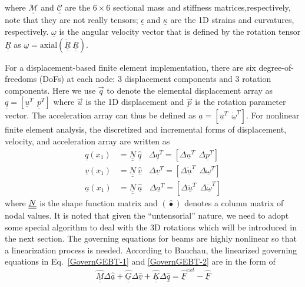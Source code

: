 where $\underline{\underline{\mathcal{M}}}$ and
$\underline{\underline{\mathcal{C}}}$ are the $6 \times 6$ sectional mass
and stiffness matrices,respectively, note that they are not really tensors;
$\underline{\epsilon}$ and $\underline{\kappa}$ are the 1D strains and
curvatures, respectively. $\underline{\omega}$ is the angular velocity
vector that is defined by the rotation tensor $\underline{\underline{R}}$ as
$\underline{\omega} = \mathrm{axial}(\dot{\underline{\underline{R}}}~\underline{\underline{R}})$.

For a displacement-based finite element implementation, there are six
degree-of-freedoms (DoFs) at each node: 3 displacement components and 3
rotation components. Here we use $\vec{q}$ to denote the elemental
displacement array as $\underline{q}=\left[
\underline{u}^T~~\underline{p}^T\right]$ where $\vec{u}$ is the 1D
displacement and $\vec{p}$ is the rotation parameter vector. The
acceleration array can thus be defined as $\underline{a}=\left[
\ddot{\underline{u}}^T~~ \dot{\underline{\omega}}^T \right]$. For nonlinear
finite element analysis, the discretized and incremental forms of
displacement, velocity, and acceleration array are written as
\begin{align}
	\label{Discretized}
	\underline{q} (x_1) &= \underline{\underline{N}} ~\hat{\underline{q}}~~~~\Delta \underline{q}^T = \left[ \Delta \underline{u}^T~~\Delta \underline{p}^T \right] \\
	\underline{v}(x_1) &= \underline{\underline{N}}~\hat{\underline{v}}~~~~\Delta \underline{v}^T = \left[\Delta \underline{\dot{u}}^T~~\Delta \underline{\omega}^T \right] \\
	\underline{a}(x_1) &= \underline{\underline{N}}~ \hat{\underline{a}}~~~~\Delta \underline{a}^T = \left[ \Delta \ddot{\underline{u}}^T~~\Delta \dot{\underline{\omega}}^T \right]	
\end{align}
where $\underline{\underline{N}}$ is the shape function matrix and $(\hat{\bullet})$ denotes
a column matrix of nodal values. It is noted that given the ``untensorial'' nature, we need to adopt some special algorithm to deal with the 3D rotations which will be introduced in the next section.   The governing equations for beams are
highly nonlinear so that a linearization process is needed. According to
Bauchau\cite{Bauchau:2010}, the linearized governing equations in
Eq.~\eqref{GovernGEBT-1} and \eqref{GovernGEBT-2} are in the form of
\begin{equation}
	\label{LinearizedEqn}
	\hat{\underline{\underline{M}}} \Delta \hat{\underline{a}} +\hat{\underline{\underline{G}}} \Delta \hat{\underline{v}}+ \hat{\underline{\underline{K}}} \Delta \hat{\underline{q}} = \hat{\underline{F}}^{ext} - \hat{\underline{F}}
\end{equation} 
